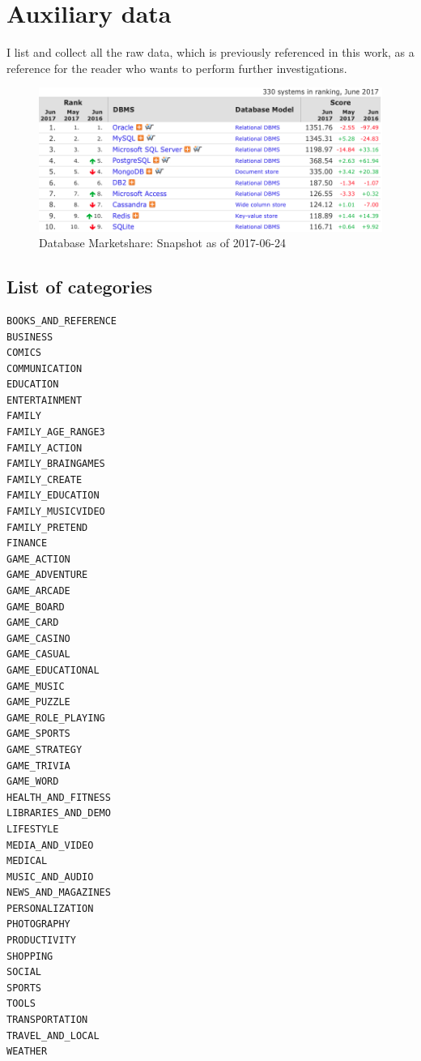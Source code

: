 \chapter{Auxiliary data}
I list and collect all the raw data, which is previously referenced in this work, as a reference for the reader who wants to perform further investigations.

\begin{figure}
	\centering
	\includegraphics[scale=0.5]{img/dbmarketshare.png}
	\caption{Database Marketshare: Snapshot as of 2017-06-24}
    \label{appendix:dbmarketshare}
\end{figure}

\section{List of categories}
\label{appendix:categorieslist}
\begin{verbatim}
BOOKS_AND_REFERENCE
BUSINESS
COMICS
COMMUNICATION
EDUCATION
ENTERTAINMENT
FAMILY
FAMILY_AGE_RANGE3
FAMILY_ACTION
FAMILY_BRAINGAMES
FAMILY_CREATE
FAMILY_EDUCATION
FAMILY_MUSICVIDEO
FAMILY_PRETEND
FINANCE
GAME_ACTION
GAME_ADVENTURE
GAME_ARCADE
GAME_BOARD
GAME_CARD
GAME_CASINO
GAME_CASUAL
GAME_EDUCATIONAL
GAME_MUSIC
GAME_PUZZLE
GAME_ROLE_PLAYING
GAME_SPORTS
GAME_STRATEGY
GAME_TRIVIA
GAME_WORD
HEALTH_AND_FITNESS
LIBRARIES_AND_DEMO
LIFESTYLE
MEDIA_AND_VIDEO
MEDICAL
MUSIC_AND_AUDIO
NEWS_AND_MAGAZINES
PERSONALIZATION
PHOTOGRAPHY
PRODUCTIVITY
SHOPPING
SOCIAL
SPORTS
TOOLS
TRANSPORTATION
TRAVEL_AND_LOCAL
WEATHER
\end{verbatim}

